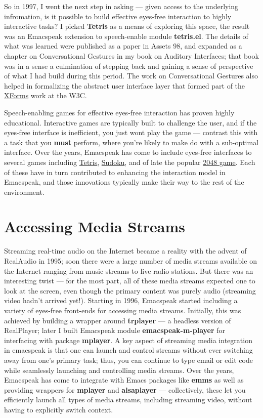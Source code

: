 \documentclass[11pt]{article}
\begin{document}
So in 1997, I went the next step in asking — given access to the
underlying infromation, is it possible to build effective
eyes-free interaction to highly interactive tasks? I picked
\textbf{Tetris} as a means of exploring this space, the result was an
Emacspeak extension to speech-enable module \textbf{tetris.el}. The
details of what was learned were published as a paper in Assets
98, and expanded as a chapter on Conversational Gestures in my
book on Auditory Interfaces; that book was in a sense a
culmination of stepping back and gaining a sense of perspective
of what I had build during this period. The work on
Conversational Gestures also helped in formalizing the abstract
user interface layer that formed part of the
\href{http://www.w3.org/MarkUp/Forms/}{XForms} work at the W3C.

Speech-enabling games for effective eyes-free interaction has
proven highly educational. Interactive games are typically built
to challenge the user, and if the eyes-free interface is
inefficient, you just wont play the game — contrast this with a
task that you \textbf{must} perform, where you're likely to make do with
a sub-optimal interface. Over the years, Emacspeak has come to
include eyes-free interfaces to several games including \href{http://en.wikipedia.org/wiki/Tetris}{Tetris},
\href{http://en.wikipedia.org/wiki/2048_(video_game)}{Sudoku}, and of late the popular \href{http://en.wikipedia.org/wiki/2048_(video_game)}{2048 game}. Each of these have in
turn contributed to enhancing the interaction model in Emacspeak,
and those innovations typically make their way to the rest of the
environment.


\section{Accessing Media Streams}
\label{sec-10}

Streaming real-time audio on the Internet became a reality with
the advent of RealAudio in 1995; soon there were a large number
of media streams available on the Internet ranging from music
streams to live radio stations. But there was an interesting
twist — for the most part, all of these media streams expected
one to look at the screen, even though the primary content was
purely audio (streaming video hadn't arrived yet!). Starting in
1996, Emacspeak started including a variety of eyes-free
front-ends for accessing media streams. Initially, this was
achieved by building a wrapper around \textbf{trplayer} — a headless
version of RealPlayer; later I built Emacspeak module
\textbf{emacspeak-m-player} for interfacing with package \textbf{mplayer}. A
key aspect of streaming media integration in emacspeak is that
one can launch and control streams without ever switching away
from one's primary task; thus, you can continue to type email or
edit code while seamlessly launching and controlling media
streams. Over the years, Emacspeak has come to integrate with
Emacs packages like \textbf{emms} as well as providing wrappers for
\textbf{mplayer} and \textbf{alsaplayer} — collectively, these let you
efficiently launch all types of media streams, including
streaming video, without having to explicitly switch context.
\end{document}
